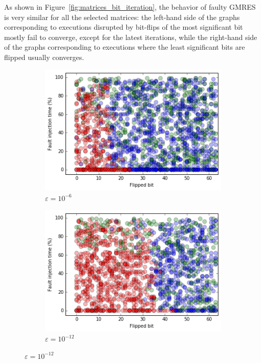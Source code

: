 \documentclass[twoside]{article}
\newcounter{fig}\setcounter{fig}{0}
\begin{document}
  As shown in Figure~\ref{fig:matrices_bit_iteration}, the behavior of faulty GMRES is very similar for all the selected matrices: the left-hand side of the graphs corresponding to executions disrupted by bit-flips of the most significant bit mostly fail to converge, except for the latest iterations, while the right-hand side of the graphs corresponding to executions where the least significant bits are flipped usually converges. %




  \begin{figure}[ht] 
    \hspace{3ex}


    \begin{subfigure}[b]{0.5\linewidth}
      \centering
      \includegraphics[width=\linewidth]{figures/bit_iteration_0.png} %
      \caption{$\varepsilon = 10^{-6}$}
      \label{fig:bit_iteration_0}	
    \end{subfigure}%
    \hspace{4ex}
    \begin{subfigure}[b]{0.5\linewidth}
      \centering
      \includegraphics[width=\linewidth]{figures/bit_iteration_1.png} %
      \caption{$\varepsilon = 10^{-12}$}
      \label{fig:bit_iteration_1}	
    \end{subfigure} 


\end{figure}
\end{document}
